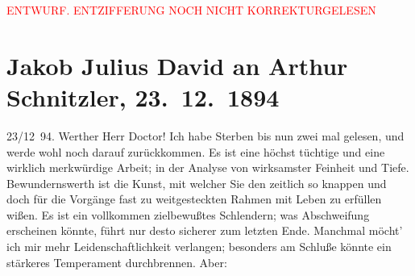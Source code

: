
\begin{center}
            \textcolor{red}{ENTWURF. ENTZIFFERUNG NOCH NICHT KORREKTURGELESEN}
                      \end{center}
            
               \section[Jakob Julius David an Arthur Schnitzler, 23. 12. 1894]{ Jakob Julius David an Arthur Schnitzler, 23. 12. 1894}\nopagebreak{}\rehead{ }\begin{ledgroupsized}[t]{13cm}\normalsize\beginnumbering{} \toendnotes[C]{\smallbreak\pagebreak[2]} 
\toendnotes[C]{\smallbreak}\pstart
           \raggedleft{}{\pb}23/12 94.\pend
           \pstart\center{}Werther Herr Doctor!\pend\pstart
           Ich habe Sterben bis nun zwei mal gelesen, und
               werde wohl noch darauf zurückkommen. Es ist eine höchst tüchtige und eine wirklich
               merkwürdige Arbeit; in der Analyse von wirksamster Feinheit und Tiefe.
               Bewundernswerth ist die Kunst, mit welcher Sie den zeitlich so knappen und doch für
               die Vorgänge fast zu weitgesteckten Rahmen mit Leben zu erfüllen wißen. Es ist ein
               vollkommen zielbewußtes Schlendern; was Abschweifung erscheinen könnte, führt nur
               desto sicherer zum letzten Ende. Manchmal möcht’ ich mir mehr Leidenschaftlichkeit
               verlangen; besonders am Schluße könnte ein stärkeres Temperament durchbrennen. Aber:

\end{ledgroupsized}
